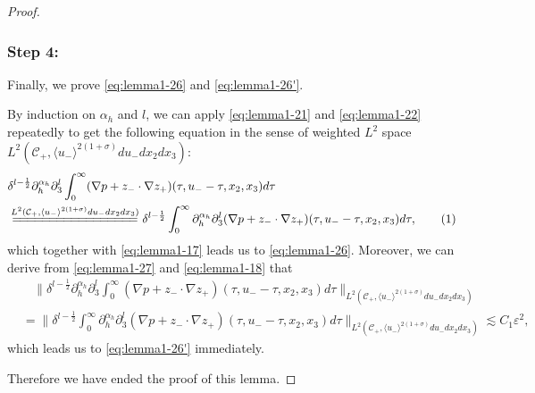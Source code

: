 \documentclass[10pt,reqno]{amsart}
\numberwithin{equation}{section}
\begin{document}
\begin{proof}
	
	
	\subsubsection*{\bf Step 4:} Finally, we  prove \eqref{eq:lemma1-26} and \eqref{eq:lemma1-26'}. 
	
	By induction on $\alpha_h$ and $l$, we can apply \eqref{eq:lemma1-21} and \eqref{eq:lemma1-22} repeatedly to get  the following equation  in the sense of weighted $L^2$ space $L^2(\mathcal{C}_+,\langle u_{-}\rangle^{2(1+\sigma)} du_-dx_2dx_3)$:
	\begin{align*}
		& 
		\delta^{l-\frac{1}{2}}\partial_h^{\alpha_h}\partial_3^l\int_0^{\infty}(\nabla p+z_{-}\cdot\nabla z_{+}) 
		(\tau,u_--\tau,x_2,x_3)d\tau\\
		&\stackrel{ L^2(\mathcal{C}_+,\langle u_-\rangle^{2(1+\sigma)}du_-dx_2dx_3)}{=\joinrel=\joinrel=\joinrel=\joinrel=\joinrel=\joinrel=\joinrel=\joinrel=\joinrel=\joinrel=\joinrel=\joinrel=\joinrel=\joinrel=\joinrel=\joinrel=}\delta^{l-\frac{1}{2}}\int_0^{\infty} \partial_h^{\alpha_h}\partial_3^l(\nabla p+z_{-}\cdot\nabla z_{+}) 
		(\tau,u_--\tau,x_2,x_3)d\tau,\stepcounter{equation}\tag{\theequation}\label{eq:lemma1-27}
	\end{align*}
which together with \eqref{eq:lemma1-17} leads us to  \eqref{eq:lemma1-26}. 
Moreover, we can derive from \eqref{eq:lemma1-27} and  \eqref{eq:lemma1-18}  that 
	\begin{align*}
		&\ \ \ \ \Big\|\delta^{l-\frac{1}{2}}\partial_h^{\alpha_h}\partial_3^l\int_0^{\infty} (\nabla p+z_{-}\cdot\nabla z_{+}) 
		(\tau,u_--\tau,x_2,x_3)d\tau\Big\|_{L^2(\mathcal{C}_+,\langle u_-\rangle^{2(1+\sigma)}du_-dx_2dx_3)}\\
		&=\Big\|\delta^{l-\frac{1}{2}}\int_0^{\infty} \partial_h^{\alpha_h}\partial_3^l(\nabla p+z_{-}\cdot\nabla z_{+}) 
		(\tau,u_--\tau,x_2,x_3)d\tau\Big\|_{L^2(\mathcal{C}_+,\langle u_-\rangle^{2(1+\sigma)}du_-dx_2dx_3)}
		\lesssim C_1\varepsilon^2, 
	\end{align*}
which leads us to \eqref{eq:lemma1-26'} immediately.


Therefore we have ended the proof of this lemma.
\end{proof}
\end{document}
